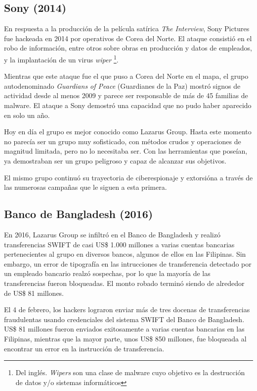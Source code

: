 \documentclass{article}
\begin{document}
\subsection{Sony (2014)}
En respuesta a la producción de la película satírica {\it The Interview}, Sony Pictures fue hackeada en 2014 por operativos de Corea del Norte. El ataque consistió en el robo de información, entre otros sobre obras en producción y datos de empleados, y la implantación de un virus {\it wiper} \footnote{Del inglés. {\it Wipers} son una clase de malware cuyo objetivo es la destrucción de datos y/o sistemas informáticos}.

Mientras que este ataque fue el que puso a Corea del Norte en el mapa, el grupo autodenominado {\it Guardians of Peace} (Guardianes de la Paz) mostró signos de actividad desde al menos 2009 y parece ser responsable de más de 45 familias de malware. El ataque a Sony demostró una capacidad que no pudo haber aparecido en solo un año.

Hoy en día el grupo es mejor conocido como Lazarus Group. Hasta este momento no parecía ser un grupo muy sofisticado, con métodos crudos y operaciones de magnitud limitada, pero no lo necesitaba ser. Con las herramientas que poseían, ya demostraban ser un grupo peligroso y capaz de alcanzar sus objetivos. \autocite{wired-sony}

El mismo grupo continuó su trayectoria de ciberespionaje y extorsióna a través de las numerosas campañas que le siguen a esta primera.

\subsection{Banco de Bangladesh (2016)}
En 2016, Lazarus Group se infiltró en el Banco de Bangladesh y realizó transferencias SWIFT de casi US\$ 1.000 millones a varias cuentas bancarias pertenecientes al grupo en diversos bancos, algunos de ellos en las Filipinas. Sin embargo, un error de tipografía en las intrucciones de transferencia detectado por un empleado bancario realzó sospechas, por lo que la mayoría de las transferencias fueron bloqueadas. El monto robado terminó siendo de alrededor de US\$ 81 millones.

El 4 de febrero, los hackers lograron enviar más de tres docenas de transferencias fraudulentas usando credenciales del sistema SWIFT del Banco de Bangladesh. US\$ 81 millones fueron enviados exitosamente a varias cuentas bancarias en las Filipinas, mientras que la mayor parte, unos US\$ 850 millones, fue bloqueada al encontrar un error en la instrucción de transferencia.
\end{document}
